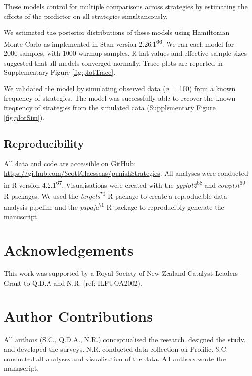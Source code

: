 \documentclass[
  english,
  man, donotrepeattitle,floatsintext]{apa6}
\begin{document}
These models control for multiple comparisons across strategies by estimating
the effects of the predictor on all strategies simultaneously.

We estimated the posterior distributions of these models using Hamiltonian Monte
Carlo as implemented in Stan version 2.26.1\textsuperscript{66}. We ran each model for
2000 samples, with 1000 warmup samples. R-hat values and effective sample sizes
suggested that all models converged normally. Trace plots are reported in
Supplementary Figure \ref{fig:plotTrace}.

We validated the model by simulating observed data (\emph{n} = 100) from a known
frequency of strategies. The model was successfully able to recover the known
frequency of strategies from the simulated data (Supplementary Figure
\ref{fig:plotSim}).

\hypertarget{reproducibility}{%
\subsection{Reproducibility}\label{reproducibility}}

All data and code are accessible on GitHub:
\url{https://github.com/ScottClaessens/punishStrategies}. All analyses were conducted
in R version 4.2.1\textsuperscript{67}. Visualisations were created with the \emph{ggplot2}\textsuperscript{68} and \emph{cowplot}\textsuperscript{69} R packages. We used the \emph{targets}\textsuperscript{70} R package to create a reproducible data analysis pipeline and the
\emph{papaja}\textsuperscript{71} R package to reproducibly generate the manuscript.

\newpage
\nolinenumbers

\hypertarget{acknowledgements}{%
\section{Acknowledgements}\label{acknowledgements}}

This work was supported by a Royal Society of New Zealand Catalyst Leaders Grant
to Q.D.A and N.R. (ref: ILFUOA2002).

\hypertarget{author-contributions}{%
\section{Author Contributions}\label{author-contributions}}

All authors (S.C., Q.D.A., N.R.) conceptualised the research, designed the
study, and developed the surveys. N.R. conducted data collection on Prolific.
S.C. conducted all analyses and visualisation of the data. All authors wrote the
manuscript.
\end{document}
